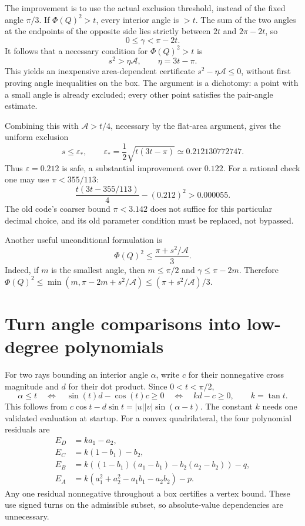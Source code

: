 \documentclass[11pt]{article}
\newcommand{\Area}{\mathcal A}
\newcommand{\PhiQ}{\Phi(Q)}
\begin{document}
The improvement is to use the actual exclusion threshold, instead of the
fixed angle \(\pi/3\).
If \(\PhiQ^2>t\), every interior angle is \(>t\).
The sum of the two angles at the endpoints of the opposite side lies
strictly between \(2t\) and \(2\pi-2t\), so
\[
 0\le\gamma<\pi-2t.
\]
It follows that a necessary condition for \(\PhiQ^2>t\) is
\[
 \boxed{s^2>\eta\Area,\qquad \eta=3t-\pi.}
\]
This yields an inexpensive area-dependent certificate
\(s^2-\eta\Area\le0\), without first proving angle inequalities on the box.
The argument is a dichotomy: a point with a small angle is already excluded;
every other point satisfies the pair-angle estimate.

Combining this with \(\Area>t/4\), necessary by the flat-area argument, gives
the uniform exclusion
\[
 s\le \varepsilon_\ast,\qquad
 \varepsilon_\ast=\frac12\sqrt{t(3t-\pi)}
     \simeq0.212130772747.
\]
Thus \(\varepsilon=0.212\) is safe, a substantial improvement over \(0.122\).
For a rational check one may use \(\pi<355/113\):
\[
 \frac{t(3t-355/113)}4-(0.212)^2>0.000055.
\]
The old code's coarser bound \(\pi<3.142\) does not suffice for this particular
decimal choice, and its old parameter condition must be replaced, not bypassed.

Another useful unconditional formulation is
\[
 \PhiQ^2\le\frac{\pi+s^2/\Area}{3}.
\]
Indeed, if \(m\) is the smallest angle, then \(m\le\pi/2\) and
\(\gamma\le\pi-2m\). Therefore
\(\PhiQ^2\le\min(m,\pi-2m+s^2/\Area)
\le(\pi+s^2/\Area)/3\).

\section{Turn angle comparisons into low-degree polynomials}
For two rays bounding an interior angle \(\alpha\), write
\(c\) for their nonnegative cross magnitude and \(d\) for their dot product.
Since \(0<t<\pi/2\),
\[
 \alpha\le t
 \quad\Longleftrightarrow\quad
 \sin(t)d-\cos(t)c\ge0
 \quad\Longleftrightarrow\quad
 k d-c\ge0,\qquad k=\tan t.
\]
This follows from
\(c\cos t-d\sin t=|u||v|\sin(\alpha-t)\).
The constant \(k\) needs one validated evaluation at startup.
For a convex quadrilateral, the four polynomial residuals are
\[
\begin{aligned}
 E_D&=ka_1-a_2,\\
 E_C&=k(1-b_1)-b_2,\\
 E_B&=k((1-b_1)(a_1-b_1)-b_2(a_2-b_2))-q,\\
 E_A&=k(a_1^2+a_2^2-a_1b_1-a_2b_2)-p.
\end{aligned}
\]
Any one residual nonnegative throughout a box certifies a vertex bound.
These use signed turns on the admissible subset, so absolute-value
dependencies are unnecessary.
\end{document}
